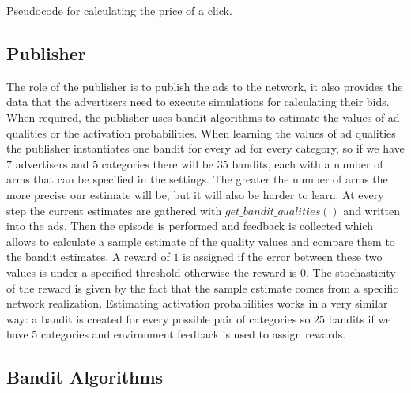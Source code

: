 \documentclass{article}
\begin{document}
\begin{algorithm}[H]
    \caption{Pseudocode for calculating the price of a click.}
\end{algorithm}


\subsection{Publisher}
The role of the publisher is to publish the ads to the network, it also provides the data that the advertisers need to execute simulations for calculating their bids. When required, the publisher uses bandit algorithms to estimate the values of ad qualities or the activation probabilities. When learning the values of ad qualities the publisher instantiates one bandit for every ad for every category, so if we have $7$ advertisers and $5$ categories there will be $35$ bandits, each with a number of arms that can be specified in the settings. The greater the number of arms the more precise our estimate will be, but it will also be harder to learn. At every step the current estimates are gathered with $get\_bandit\_qualities()$ and written into the ads. Then the episode is performed and feedback is collected which allows to calculate a sample estimate of the quality values and compare them to the bandit estimates. A reward of $1$ is assigned if the error between these two values is under a specified threshold otherwise the reward is $0$. The stochasticity of the reward is given by the fact that the sample estimate comes from a specific network realization. Estimating activation probabilities works in a very similar way: a bandit is created for every possible pair of categories so $25$ bandits if we have $5$ categories and environment feedback is used to assign rewards.


\subsection{Bandit Algorithms}
\end{document}
